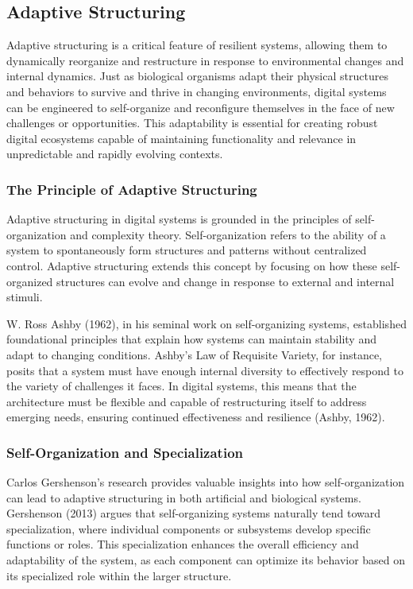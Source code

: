 \documentclass[12pt,twoside]{article}
\begin{document}
\subsection{Adaptive Structuring}
Adaptive structuring is a critical feature of resilient systems, allowing them to dynamically reorganize and restructure in response to environmental changes and internal dynamics. Just as biological organisms adapt their physical structures and behaviors to survive and thrive in changing environments, digital systems can be engineered to self-organize and reconfigure themselves in the face of new challenges or opportunities. This adaptability is essential for creating robust digital ecosystems capable of maintaining functionality and relevance in unpredictable and rapidly evolving contexts.

\subsubsection{The Principle of Adaptive Structuring}

Adaptive structuring in digital systems is grounded in the principles of self-organization and complexity theory. Self-organization refers to the ability of a system to spontaneously form structures and patterns without centralized control. Adaptive structuring extends this concept by focusing on how these self-organized structures can evolve and change in response to external and internal stimuli.

W. Ross Ashby (1962), in his seminal work on self-organizing systems, established foundational principles that explain how systems can maintain stability and adapt to changing conditions. Ashby's Law of Requisite Variety, for instance, posits that a system must have enough internal diversity to effectively respond to the variety of challenges it faces. In digital systems, this means that the architecture must be flexible and capable of restructuring itself to address emerging needs, ensuring continued effectiveness and resilience (Ashby, 1962).

\subsubsection{Self-Organization and Specialization}

Carlos Gershenson's research provides valuable insights into how self-organization can lead to adaptive structuring in both artificial and biological systems. Gershenson (2013) argues that self-organizing systems naturally tend toward specialization, where individual components or subsystems develop specific functions or roles. This specialization enhances the overall efficiency and adaptability of the system, as each component can optimize its behavior based on its specialized role within the larger structure.
\end{document}
